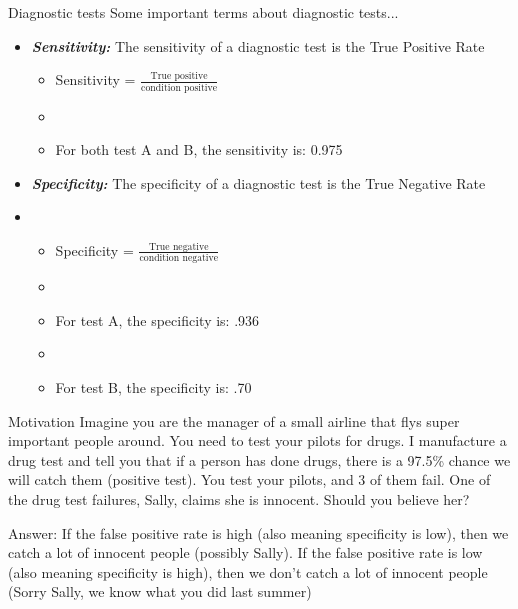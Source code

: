 \documentclass[xcolor=dvipsnames]{beamer}
\begin{document}
\begin{frame}{Diagnostic tests}
Some important terms about diagnostic tests... 
	\begin{itemize}
		\item \textbf{\emph{Sensitivity:}} The sensitivity of a diagnostic test is the True Positive Rate \pause
		\begin{itemize}
			\item Sensitivity = $\frac{\text{True positive}}{\text{condition positive}}$
			\item[]
			\item For both test A and B, the sensitivity is: 0.975 \pause
		\end{itemize}
		\item \textbf{\emph{Specificity:}} The specificity of a diagnostic test is the True Negative Rate \pause
		\item[]	
		\begin{itemize}
			\item Specificity = $\frac{\text{True negative}}{\text{condition negative}}$
			\item[]
			\item For test A, the specificity is: .936
			\item[]
			\item For test B, the specificity is: .70
		\end{itemize}
	\end{itemize}
\end{frame}

\begin{frame}{Motivation}
Imagine you are the manager of a small airline that flys super important people around. You need to test your pilots for drugs. I manufacture a drug test and tell you that if a person has done drugs, there is a 97.5\% chance we will catch them (positive test). You test your pilots, and 3 of them fail. One of the drug test failures, Sally, claims she is innocent. Should you believe her? \pause

\vspace{10pt}
Answer: If the false positive rate is high (also meaning specificity is low), then we catch a lot of innocent people (possibly Sally). If the false positive rate is low (also meaning specificity is high), then we don't catch a lot of innocent people (Sorry Sally, we know what you did last summer)
\end{frame}
\end{document}
